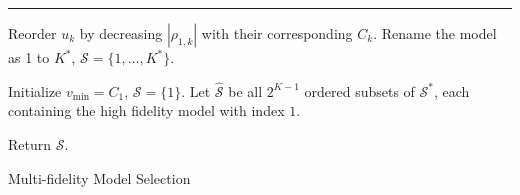 

\normalem
\begin{algorithm}[!ht]
\label{algo:MFMC_Algo_model_selection}
\DontPrintSemicolon    
   \vspace{1ex}
    
    \vspace{1ex}
    \hrule \vspace{1ex}

   
   
   Reorder $u_k$ by decreasing $|\rho_{1,k}|$ with their corresponding $C_k$. Rename the model as 1 to $K^*$, $\mathcal{S}=\{1,\ldots, K^*\}$. 
   
   Initialize $v_{\min}=C_1$, $\mathcal{S}=\{1\}$. Let $ \mathcal{\widehat S}$ be all $2^{K-1}$ ordered subsets of $\mathcal{S}^*$, each containing the high fidelity model with index $1$. 

    Return  $\mathcal{S}$.
\caption{Multi-fidelity Model Selection}
\end{algorithm}
\ULforem


